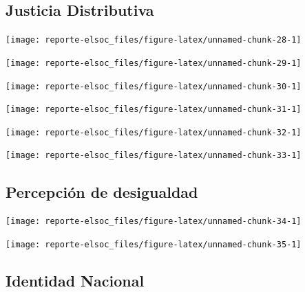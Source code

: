 \documentclass[
  12pt,
]{book}
\begin{document}
\hypertarget{justicia-distributiva}{%
\subsection{Justicia Distributiva}\label{justicia-distributiva}}

\begin{center}\texttt{[image: reporte-elsoc\_files/figure-latex/unnamed-chunk-28-1]} \end{center}

\begin{center}\texttt{[image: reporte-elsoc\_files/figure-latex/unnamed-chunk-29-1]} \end{center}

\begin{center}\texttt{[image: reporte-elsoc\_files/figure-latex/unnamed-chunk-30-1]} \end{center}

\begin{center}\texttt{[image: reporte-elsoc\_files/figure-latex/unnamed-chunk-31-1]} \end{center}

\begin{center}\texttt{[image: reporte-elsoc\_files/figure-latex/unnamed-chunk-32-1]} \end{center}

\begin{center}\texttt{[image: reporte-elsoc\_files/figure-latex/unnamed-chunk-33-1]} \end{center}

\hypertarget{percepciuxf3n-de-desigualdad}{%
\subsection{Percepción de desigualdad}\label{percepciuxf3n-de-desigualdad}}

\begin{center}\texttt{[image: reporte-elsoc\_files/figure-latex/unnamed-chunk-34-1]} \end{center}

\begin{center}\texttt{[image: reporte-elsoc\_files/figure-latex/unnamed-chunk-35-1]} \end{center}

\hypertarget{identidad-nacional}{%
\subsection{Identidad Nacional}\label{identidad-nacional}}
\end{document}
